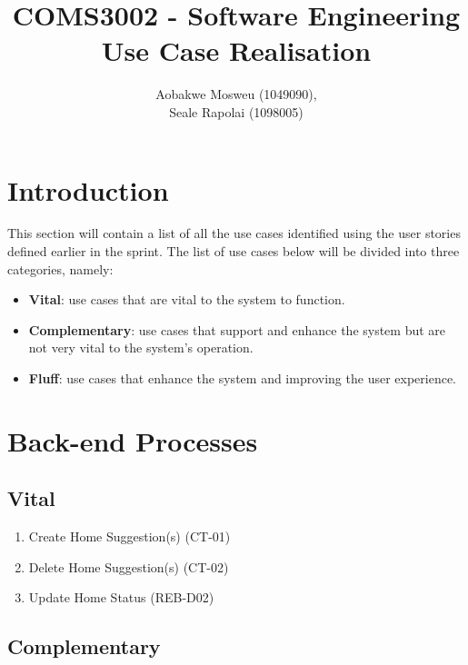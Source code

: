 \documentclass[11pt]{article}
\begin{document}
	\title{
		COMS3002 - Software Engineering\\
		\large Use Case Realisation
	}
	\author{Aobakwe Mosweu (1049090), \\Seale Rapolai (1098005)}
	\maketitle
	
	\clearpage
	\tableofcontents
	\clearpage
	
	\section{Introduction}
	\begin{flushleft}
		This section will contain a list of all the use cases identified using the user stories defined earlier in the sprint. The list of use cases below will be divided into three categories, namely:
	\end{flushleft}
	\begin{itemize}
		\item \textbf{Vital}: use cases that are vital to the system to function.
		\item \textbf{Complementary}: use cases that support and enhance the system but are not very vital to the system's operation.
		\item \textbf{Fluff}: use cases that enhance the system and improving the user experience.
	\end{itemize}
	
	\section{Back-end Processes}
	\begin{flushleft}
		
	\end{flushleft}
		\subsection{Vital}
		\begin{enumerate}[i]
			\item Create Home Suggestion(s) (CT-01)
			\item Delete Home Suggestion(s) (CT-02)
			\item Update Home Status (REB-D02)
		\end{enumerate}
		
		\subsection{Complementary}
		
\end{document}
